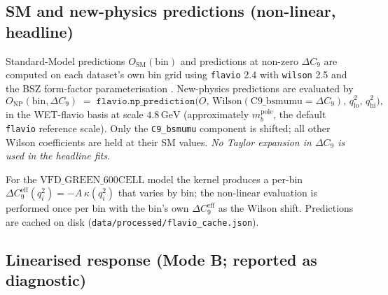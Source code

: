 \subsection{SM and new-physics predictions (non-linear, headline)}

Standard-Model predictions $O_{\mathrm{SM}}(\mathrm{bin})$ and
predictions at non-zero $\Delta C_{9}$ are computed on each dataset's
own bin grid using \texttt{flavio} 2.4 \citep{Straub2018Flavio} with
\texttt{wilson} 2.5 \citep{Aebischer2018Wilson} and the BSZ
form-factor parameterisation \citep{Bharucha2016BSZ}. New-physics
predictions are evaluated by
\begin{equation}\label{eq:np_pred}
O_{\mathrm{NP}}(\mathrm{bin}, \Delta C_{9})
\;=\; \texttt{flavio.np\_prediction}\bigl(O,\, \mathrm{Wilson}(\mathrm{C9\_bsmumu}=\Delta C_{9}),\,
   q^{2}_{\mathrm{lo}},\, q^{2}_{\mathrm{hi}}\bigr),
\end{equation}
in the WET-flavio basis at scale $4.8\,\mathrm{GeV}$ (approximately
$m_{b}^{\mathrm{pole}}$, the default \texttt{flavio} reference scale).
Only the \texttt{C9\_bsmumu} component is shifted; all other Wilson
coefficients are held at their SM values. \emph{No Taylor expansion
in $\Delta C_{9}$ is used in the headline fits.}

For the $\mathrm{VFD\_GREEN\_600CELL}$ model the kernel produces a
per-bin $\Delta C_{9}^{\mathrm{eff}}(q^{2}_{i}) = -A\,\kappa(q^{2}_{i})$
that varies by bin; the non-linear evaluation is performed once per
bin with the bin's own $\Delta C_{9}^{\mathrm{eff}}$ as the Wilson
shift. Predictions are cached on disk
(\texttt{data/processed/flavio\_cache.json}).

\subsection{Linearised response (Mode B; reported as diagnostic)}

